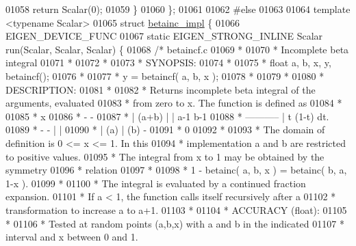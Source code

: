 \begin{DoxyCode}
01058     \textcolor{keywordflow}{return} Scalar(0);
01059   \}
01060 \};
01061 
01062 \textcolor{preprocessor}{#else}
01063 
01064 \textcolor{keyword}{template} <\textcolor{keyword}{typename} Scalar>
01065 \textcolor{keyword}{struct }\hyperlink{struct_eigen_1_1internal_1_1betainc__impl}{betainc\_impl} \{
01066   EIGEN\_DEVICE\_FUNC
01067   \textcolor{keyword}{static} EIGEN\_STRONG\_INLINE Scalar run(Scalar, Scalar, Scalar) \{
01068     \textcolor{comment}{/*  betaincf.c}
01069 \textcolor{comment}{     *}
01070 \textcolor{comment}{     *  Incomplete beta integral}
01071 \textcolor{comment}{     *}
01072 \textcolor{comment}{     *}
01073 \textcolor{comment}{     * SYNOPSIS:}
01074 \textcolor{comment}{     *}
01075 \textcolor{comment}{     * float a, b, x, y, betaincf();}
01076 \textcolor{comment}{     *}
01077 \textcolor{comment}{     * y = betaincf( a, b, x );}
01078 \textcolor{comment}{     *}
01079 \textcolor{comment}{     *}
01080 \textcolor{comment}{     * DESCRIPTION:}
01081 \textcolor{comment}{     *}
01082 \textcolor{comment}{     * Returns incomplete beta integral of the arguments, evaluated}
01083 \textcolor{comment}{     * from zero to x.  The function is defined as}
01084 \textcolor{comment}{     *}
01085 \textcolor{comment}{     *                  x}
01086 \textcolor{comment}{     *     -            -}
01087 \textcolor{comment}{     *    | (a+b)      | |  a-1     b-1}
01088 \textcolor{comment}{     *  -----------    |   t   (1-t)   dt.}
01089 \textcolor{comment}{     *   -     -     | |}
01090 \textcolor{comment}{     *  | (a) | (b)   -}
01091 \textcolor{comment}{     *                 0}
01092 \textcolor{comment}{     *}
01093 \textcolor{comment}{     * The domain of definition is 0 <= x <= 1.  In this}
01094 \textcolor{comment}{     * implementation a and b are restricted to positive values.}
01095 \textcolor{comment}{     * The integral from x to 1 may be obtained by the symmetry}
01096 \textcolor{comment}{     * relation}
01097 \textcolor{comment}{     *}
01098 \textcolor{comment}{     *    1 - betainc( a, b, x )  =  betainc( b, a, 1-x ).}
01099 \textcolor{comment}{     *}
01100 \textcolor{comment}{     * The integral is evaluated by a continued fraction expansion.}
01101 \textcolor{comment}{     * If a < 1, the function calls itself recursively after a}
01102 \textcolor{comment}{     * transformation to increase a to a+1.}
01103 \textcolor{comment}{     *}
01104 \textcolor{comment}{     * ACCURACY (float):}
01105 \textcolor{comment}{     *}
01106 \textcolor{comment}{     * Tested at random points (a,b,x) with a and b in the indicated}
01107 \textcolor{comment}{     * interval and x between 0 and 1.}

\end{DoxyCode}
